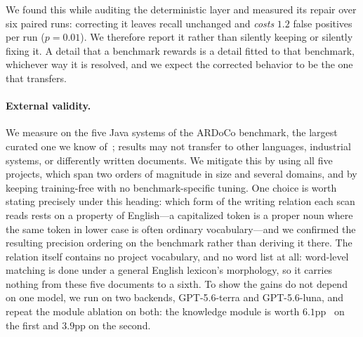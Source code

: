 We found this while auditing the deterministic layer and measured its repair over six paired runs: correcting it leaves recall unchanged and \emph{costs} $1.2$ false positives per run ($p=0.01$).
We therefore report it rather than silently keeping or silently fixing it.
A detail that a benchmark rewards is a detail fitted to that benchmark, whichever way it is resolved, and we expect the corrected behavior to be the one that transfers.

\paragraph{External validity.}
We measure on the five Java systems of the ARDoCo benchmark, the largest curated one we know of~\cite{fuchs_establishing_2023}; results may not transfer to other languages, industrial systems, or differently written documents.
We mitigate this by using all five projects, which span two orders of magnitude in size and several domains, and by keeping \approach{} training-free with no benchmark-specific tuning.
One choice is worth stating precisely under this heading: which form of the writing relation each scan reads rests on a property of English---a capitalized token is a proper noun where the same token in lower case is often ordinary vocabulary---and we confirmed the resulting precision ordering on the benchmark rather than deriving it there.
The relation itself contains no project vocabulary, and no word list at all: word-level matching is done under a general English lexicon's morphology, so it carries nothing from these five documents to a sixth.
To show the gains do not depend on one model, we run \approach{} on two backends, GPT-5.6-terra and GPT-5.6-luna, and repeat the module ablation on both: the knowledge module is worth $6.1$pp \avgfone\ on the first and $3.9$pp on the second.

